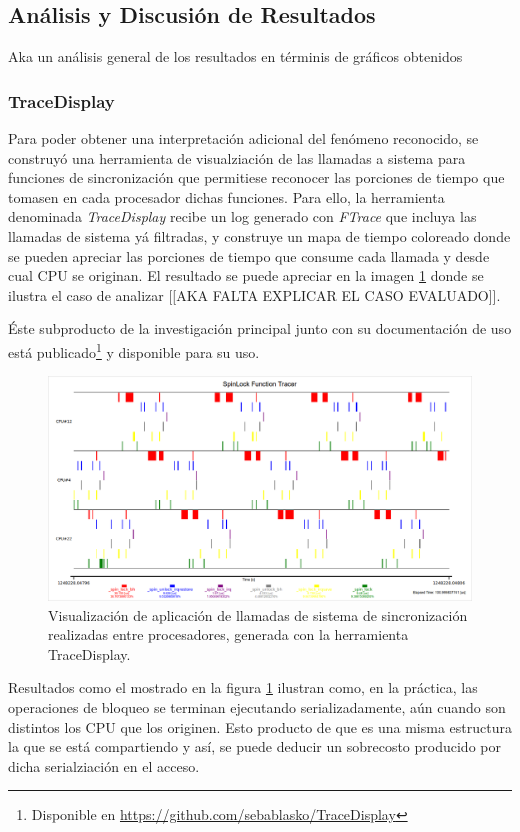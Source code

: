 \subsection{Análisis y Discusión de Resultados}
Aka un análisis general de los resultados en términis de gráficos obtenidos

\subsubsection{TraceDisplay}
Para poder obtener una interpretación adicional del fenómeno reconocido, se construyó una herramienta de visualziación de las llamadas a sistema para funciones de sincronización que permitiese reconocer las porciones de tiempo que tomasen en cada procesador dichas funciones. Para ello, la herramienta denominada \emph{TraceDisplay} recibe un log generado con \emph{FTrace} que incluya las llamadas de sistema yá filtradas, y construye un mapa de tiempo coloreado donde se pueden apreciar las porciones de tiempo que consume cada llamada y desde cual CPU se originan. El resultado se puede apreciar en la imagen \ref{fig:traceDisplay} donde se ilustra el caso de analizar [[AKA FALTA EXPLICAR EL CASO EVALUADO]].

Éste subproducto de la investigación principal junto con su documentación de uso está publicado\footnote{Disponible en \url{https://github.com/sebablasko/TraceDisplay}} y disponible para su uso.

\begin{figure}[!h]
	\centering
	\includegraphics[scale=0.34]{imagenes/traceVisualization.png}
	\caption{Visualización de aplicación de llamadas de sistema de sincronización realizadas entre procesadores, generada con la herramienta TraceDisplay.}
	\label{fig:traceDisplay}
\end{figure}

Resultados como el mostrado en la figura \ref{fig:traceDisplay} ilustran como, en la práctica, las operaciones de bloqueo se terminan ejecutando serializadamente, aún cuando son distintos los CPU que los originen. Esto producto de que es una misma estructura la que se está compartiendo y así, se puede deducir un sobrecosto producido por dicha serialziación en el acceso.


